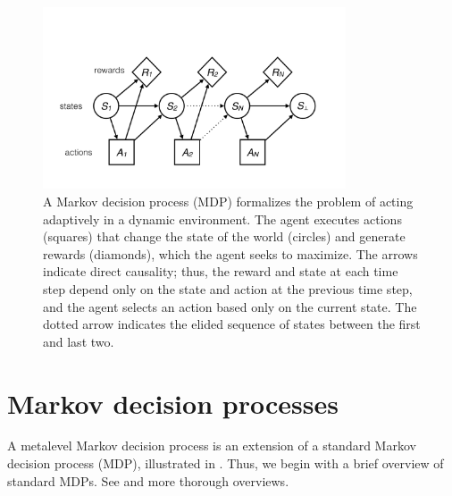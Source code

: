 

\begin{figure}
  \centering
  \includegraphics[width=0.8\textwidth,page=1,trim=0 100 0 200]{diagrams/metamdp.pdf}
  \caption{
    A Markov decision process (MDP) formalizes the problem of acting adaptively in a dynamic environment. The agent executes actions (squares) that change the state of the world (circles) and generate rewards (diamonds), which the agent seeks to maximize. The arrows indicate direct causality; thus, the reward and state at each time step depend only on the state and action at the previous time step, and the agent selects an action based only on the current state. The dotted arrow indicates the elided sequence of states between the first and last two.
  }
  \label{fig:mdp-diagram}
\end{figure}


\section{Markov decision processes}

A metalevel Markov decision process is an extension of a standard Markov decision process (MDP), illustrated in . Thus, we begin with a brief overview of standard MDPs. See \citet{puterman2014markov} and \citet{sutton2018reinforcement} more thorough overviews.

